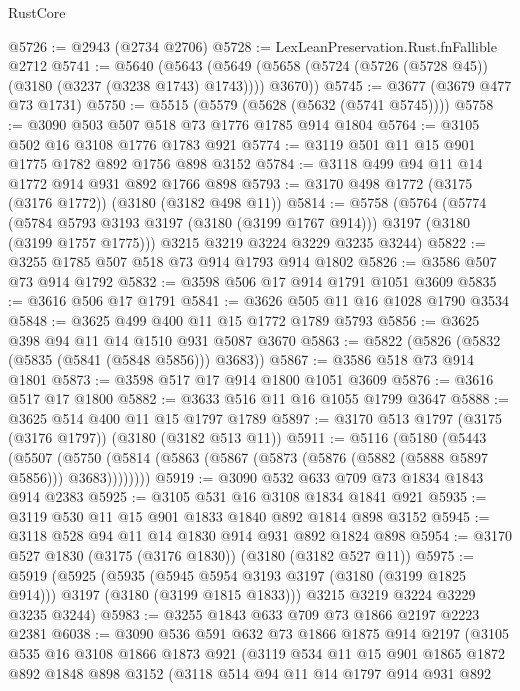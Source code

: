 \begin{lexlean}{RustCore}
\begin{coremodule}
@5726 := @2943 (@2734 @2706)
@5728 := LexLeanPreservation.Rust.fnFallible @2712
@5741 := @5640
    (@5643 (@5649 (@5658 (@5724 (@5726 (@5728 @45)) (@3180 (@3237 (@3238 @1743) @1743)))) @3670))
@5745 := @3677 (@3679 @477 @73 @1731)
@5750 := @5515 (@5579 (@5628 (@5632 (@5741 @5745))))
@5758 := @3090 @503 @507 @518 @73 @1776 @1785 @914 @1804
@5764 := @3105 @502 @16 @3108 @1776 @1783 @921
@5774 := @3119 @501 @11 @15 @901 @1775 @1782 @892 @1756 @898 @3152
@5784 := @3118 @499 @94 @11 @14 @1772 @914 @931 @892 @1766 @898
@5793 := @3170 @498 @1772 (@3175 (@3176 @1772)) (@3180 (@3182 @498 @11))
@5814 := @5758
    (@5764
      (@5774 (@5784 @5793 @3193 @3197 (@3180 (@3199 @1767 @914))) @3197 (@3180 (@3199 @1757 @1775)))
      @3215
      @3219
      @3224
      @3229
      @3235
      @3244)
@5822 := @3255 @1785 @507 @518 @73 @914 @1793 @914 @1802
@5826 := @3586 @507 @73 @914 @1792
@5832 := @3598 @506 @17 @914 @1791 @1051 @3609
@5835 := @3616 @506 @17 @1791
@5841 := @3626 @505 @11 @16 @1028 @1790 @3534
@5848 := @3625 @499 @400 @11 @15 @1772 @1789 @5793
@5856 := @3625 @398 @94 @11 @14 @1510 @931 @5087 @3670
@5863 := @5822 (@5826 (@5832 (@5835 (@5841 (@5848 @5856))) @3683))
@5867 := @3586 @518 @73 @914 @1801
@5873 := @3598 @517 @17 @914 @1800 @1051 @3609
@5876 := @3616 @517 @17 @1800
@5882 := @3633 @516 @11 @16 @1055 @1799 @3647
@5888 := @3625 @514 @400 @11 @15 @1797 @1789
@5897 := @3170 @513 @1797 (@3175 (@3176 @1797)) (@3180 (@3182 @513 @11))
@5911 := @5116
    (@5180
      (@5443
        (@5507 (@5750 (@5814 (@5863 (@5867 (@5873 (@5876 (@5882 (@5888 @5897 @5856))) @3683))))))))
@5919 := @3090 @532 @633 @709 @73 @1834 @1843 @914 @2383
@5925 := @3105 @531 @16 @3108 @1834 @1841 @921
@5935 := @3119 @530 @11 @15 @901 @1833 @1840 @892 @1814 @898 @3152
@5945 := @3118 @528 @94 @11 @14 @1830 @914 @931 @892 @1824 @898
@5954 := @3170 @527 @1830 (@3175 (@3176 @1830)) (@3180 (@3182 @527 @11))
@5975 := @5919
    (@5925
      (@5935 (@5945 @5954 @3193 @3197 (@3180 (@3199 @1825 @914))) @3197 (@3180 (@3199 @1815 @1833)))
      @3215
      @3219
      @3224
      @3229
      @3235
      @3244)
@5983 := @3255 @1843 @633 @709 @73 @1866 @2197 @2223 @2381
@6038 := @3090
    @536
    @591
    @632
    @73
    @1866
    @1875
    @914
    @2197
    (@3105
      @535
      @16
      @3108
      @1866
      @1873
      @921
      (@3119
        @534
        @11
        @15
        @901
        @1865
        @1872
        @892
        @1848
        @898
        @3152
        (@3118
          @514
          @94
          @11
          @14
          @1797
          @914
          @931
          @892

\end{coremodule}
\end{lexlean}

